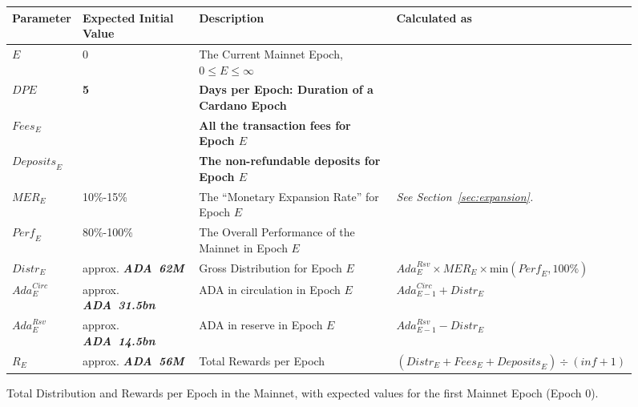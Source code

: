 \documentclass[11pt,a4paper,dvipsnames,twosided,final]{article}
\newcommand{\ada}{ADA{}}
\newcommand{\ADA}[1]{\textbf{\emph{\ada~{#1}}}}
\newcommand{\cardano}[1]{Cardano}
\begin{document}
\begin{figure}[h!]
\begin{center}
\begin{tabular}{||l|p{2.4cm}|p{6cm}|p{3.9cm}||}
  \hline \hline
\textbf{Parameter} & \textbf{Expected Initial Value} & \textbf{Description} & \textbf{Calculated as} \\\hline
$\textit{E}$ & $0$ & The Current Mainnet Epoch, $0 \le E \le \infty$ & \\\hline
\textbf{\color{green} $\textit{DPE}$} & \textbf{\color{green} 5} & \textbf{\color{green} Days per Epoch: Duration of a \cardano{} Epoch} & \\\hline
\textbf{\color{cyan} $\textit{Fees}_E$} & & \textbf{\color{cyan} All the transaction fees for Epoch $E$} & \\\hline
\textbf{\color{cyan} $\textit{Deposits}_E$} & & \textbf{\color{cyan} The non-refundable deposits for Epoch $E$} & \\\hline
$\textit{MER}_E$ & 10\%-15\% &  The ``Monetary Expansion Rate'' for Epoch $E$ & \emph{See Section~\ref{sec:expansion}.} \\\hline
$\textit{Perf}_E$ & 80\%-100\% &  The Overall Performance of the Mainnet in Epoch $E$ &  \\\hline
$\textit{Distr}_E$ & approx. \ADA{62M} & Gross Distribution for Epoch $E$ & $\textit{Ada}^{\textit{Rsv}}_E \times \textit{MER}_E \times \textrm{min}(\textit{Perf}_E, 100\%)$ \\\hline
$\textit{Ada}^{\textit{Circ}}_E$ & approx. \ADA{31.5bn}  & \ada{} in circulation in Epoch $E$ & $\textit{Ada}^{\textit{Circ}}_{E-1} + \textit{Distr}_E$ \\\hline
$\textit{Ada}^{\textit{Rsv}}_E$ & approx. \ADA{14.5bn} & \ada{} in reserve in Epoch $E$ & $\textit{Ada}^{\textit{Rsv}}_{E-1} - \textit{Distr}_E$ \\\hline
$R_E$ & approx. \ADA{56M} & Total Rewards per Epoch & $ (\textit{Distr}_E + \textit{Fees}_E + \textit{Deposits}_E) \div (\textit{inf}+1)$ \\\hline
  \hline
\end{tabular}
\end{center}
\caption{Total Distribution and Rewards per Epoch in the Mainnet, with expected values for the first Mainnet Epoch (Epoch 0).}
\end{figure}
\end{document}
